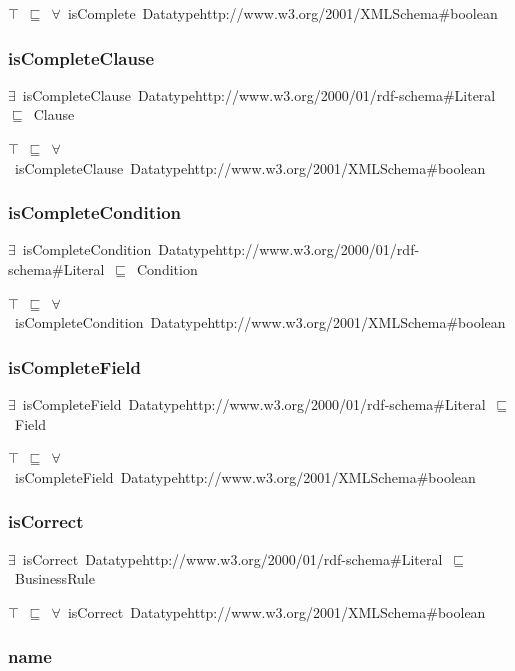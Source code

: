 \documentclass{article}
\begin{document}
\ensuremath{\top}~\ensuremath{\sqsubseteq}~\ensuremath{\forall}~isComplete~Datatypehttp://www.w3.org/2001/XMLSchema#boolean

\subsubsection*{isCompleteClause}

\ensuremath{\exists}~isCompleteClause~Datatypehttp://www.w3.org/2000/01/rdf-schema#Literal~\ensuremath{\sqsubseteq}~Clause

\ensuremath{\top}~\ensuremath{\sqsubseteq}~\ensuremath{\forall}~isCompleteClause~Datatypehttp://www.w3.org/2001/XMLSchema#boolean

\subsubsection*{isCompleteCondition}

\ensuremath{\exists}~isCompleteCondition~Datatypehttp://www.w3.org/2000/01/rdf-schema#Literal~\ensuremath{\sqsubseteq}~Condition

\ensuremath{\top}~\ensuremath{\sqsubseteq}~\ensuremath{\forall}~isCompleteCondition~Datatypehttp://www.w3.org/2001/XMLSchema#boolean

\subsubsection*{isCompleteField}

\ensuremath{\exists}~isCompleteField~Datatypehttp://www.w3.org/2000/01/rdf-schema#Literal~\ensuremath{\sqsubseteq}~Field

\ensuremath{\top}~\ensuremath{\sqsubseteq}~\ensuremath{\forall}~isCompleteField~Datatypehttp://www.w3.org/2001/XMLSchema#boolean

\subsubsection*{isCorrect}

\ensuremath{\exists}~isCorrect~Datatypehttp://www.w3.org/2000/01/rdf-schema#Literal~\ensuremath{\sqsubseteq}~BusinessRule

\ensuremath{\top}~\ensuremath{\sqsubseteq}~\ensuremath{\forall}~isCorrect~Datatypehttp://www.w3.org/2001/XMLSchema#boolean

\subsubsection*{name}
\end{document}
